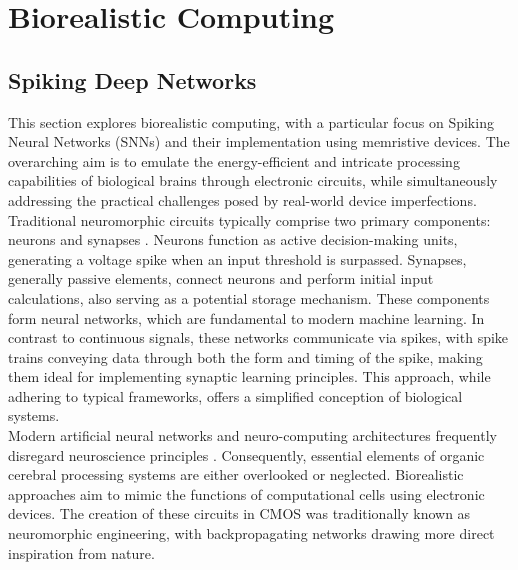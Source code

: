 
\chapter{Biorealistic Computing}

\section[Spiking Deep Networks]{Spiking Deep Networks}

This section explores biorealistic computing, with a particular focus on Spiking Neural Networks (SNNs) and their implementation using memristive devices. The overarching aim is to emulate the energy-efficient and intricate processing capabilities of biological brains through electronic circuits, while simultaneously addressing the practical challenges posed by real-world device imperfections.\\

\noindent Traditional neuromorphic circuits typically comprise two primary components: neurons and synapses \cite{mead1989analog}. Neurons function as active decision-making units, generating a voltage spike when an input threshold is surpassed. Synapses, generally passive elements, connect neurons and perform initial input calculations, also serving as a potential storage mechanism. These components form neural networks, which are fundamental to modern machine learning. In contrast to continuous signals, these networks communicate via spikes, with spike trains conveying data through both the form and timing of the spike, making them ideal for implementing synaptic learning principles. This approach, while adhering to typical frameworks, offers a simplified conception of biological systems.\\

\noindent Modern artificial neural networks and neuro-computing architectures frequently disregard neuroscience principles \cite{pfeiffer2018deep}. Consequently, essential elements of organic cerebral processing systems are either overlooked or neglected. Biorealistic approaches aim to mimic the functions of computational cells using electronic devices. The creation of these circuits in CMOS was traditionally known as neuromorphic engineering, with backpropagating networks drawing more direct inspiration from nature.

